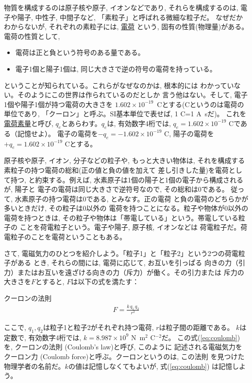 物質を構成するのは原子核や原子, イオンなどであり, それらを構成するのは, 
電子や陽子, 中性子, 中間子など, 「素粒子」と呼ばれる微細な粒子だ。
なぜだかわからないが, それぞれの素粒子には, \underline{電荷}
という, 固有の性質(物理量)がある。
電荷の性質として, 
\begin{itemize}
\item 電荷は正と負という符号のある量である。
\item 電子1個と陽子1個は, 同じ大きさで逆の符号の電荷を持っている。
\end{itemize}
ということが知られている。これらがなぜなのかは, 根本的には
わかっていない。そのようにこの世界は作られているのだとしか
言う他はない。そして, 電子1個や陽子1個が持つ電荷の大きさを
$1.602\times 10^{-19}$~Cとする(Cというのは電荷の単位であり, 
「クーロン」と呼ぶ。SI基本単位で表せば, 1 C=1 A~sだ)。
これを\underline{電荷素量}と呼び, 
$q_e$とあらわす。$q_e$は, 有効数字4桁では, 
$q_e=1.602\times10^{-19}\text{ C}$である（記憶せよ）。
電子の電荷を$-q_e=-1.602\times10^{-19}\text{ C}$, 
陽子の電荷を$+q_e=1.602\times10^{-19}\text{ C}$とする。

原子核や原子, イオン, 分子などの粒子や, もっと大きい物体は, 
それを構成する素粒子の持つ電荷の総和(正の値と負の値を加えて
差し引きした量)を電荷として持つ, と約束する。例えば, 
水素原子は1個の陽子と1個の電子から構成されるが, 陽子と
電子の電荷は同じ大きさで逆符号なので, その総和は0である。
従って, 水素原子の持つ電荷は0である, とみなす。正の電荷
と負の電荷のどちらかが多いときだけ, その粒子は0以外の
電荷を持つことになる。粒子や物体が0以外の電荷を持つときは, 
その粒子や物体は「帯電している」という。帯電している粒子の
ことを荷電粒子という。電子や陽子, 原子核, イオンなどは
荷電粒子だ。荷電粒子のことを電荷ということもある。\mv

さて, 電磁気力のひとつを紹介しよう。「粒子1」と「粒子2」という2つの荷電粒子がある
とき, それらの間には, 電荷に応じて, お互いを引っぱる
向きの力（引力）またはお互いを遠ざける向きの力（斥力）が働く。その引力または
斥力の大きさを$F$とすると, $F$は以下の式を満たす：
\begin{itembox}{クーロンの法則}
\begin{eqnarray}
F=\frac{k\,q_1\,q_2}{r^2}\label{eq:coulomb}
\end{eqnarray}
\end{itembox}
ここで, $q_1, q_2$は粒子1と粒子2がそれぞれ持つ電荷, $r$は粒子間の距離である。
$k$は定数で, 有効数字4桁では, $k=8.987\times 10^{9}$ N~m$^2$ C$^{-2}$だ。
この式(\ref{eq:coulomb})を, クーロンの法則 (Coulomb's law)と呼び, このように
記述される電磁気力をクーロン力 (Coulomb force)と呼ぶ。クーロンというのは, この法則
を見つけた物理学者の名前だ。$k$の値は記憶しなくてもよいが, 式(\ref{eq:coulomb})
は記憶しよう。\mv

